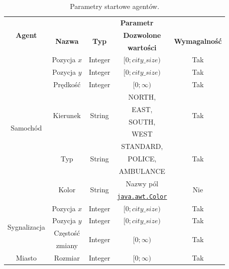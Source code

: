 \documentclass[a4paper,11pt]{article}
\begin{document}
\begin{table}[ht!]
    \centering
    \begin{tabular}{|c|c|c|c|c|}
        \hline
        \multirow{3}{*}{\textbf{Agent}} & \multicolumn{4}{|c|}{\textbf{Parametr}} \\
        \cline{2-5}
        & \multirow{2}{*}{\textbf{Nazwa}} & \multirow{2}{*}{\textbf{Typ}} & \textbf{Dozwolone} & \multirow{2}{*}{\textbf{Wymagalność}} \\
        &&& \textbf{wartości} & \\
        \hline
        \multirow{12}{*}{Samochód} & Pozycja $x$ & Integer & $[0;city\_size)$ & Tak \\
        \cline{2-5}
        & Pozycja $y$ & Integer & $[0;city\_size)$ & Tak \\
        \cline{2-5}
        & Prędkość & Integer & $[0;\infty)$ & Tak \\
        \cline{2-5}
        & \multirow{4}{*}{Kierunek} & \multirow{4}{*}{String} & NORTH, & \multirow{4}{*}{Tak} \\
        &&& EAST, & \\
        &&& SOUTH, & \\
        &&& WEST & \\
        \cline{2-5}
        & \multirow{3}{*}{Typ} & \multirow{3}{*}{String} & STANDARD, & \multirow{3}{*}{Tak} \\
        &&& POLICE, & \\
        &&& AMBULANCE & \\
        \cline{2-5}
        & \multirow{2}{*}{Kolor} & \multirow{2}{*}{String} & Nazwy pól & \multirow{2}{*}{Nie} \\
        &&& \href{http://docs.oracle.com/javase/1.4.2/docs/api/java/awt/Color.html}{\texttt{java.awt.Color}} & \\
        \hline
        \multirow{4}{*}{Sygnalizacja} & Pozycja $x$ & Integer & $[0;city\_size)$ & Tak \\
        \cline{2-5}
        & Pozycja $y$ & Integer & $[0;city\_size)$ & Tak \\
        \cline{2-5}
        & Częstość & \multirow{2}{*}{Integer} & \multirow{2}{*}{$[0;\infty)$} & \multirow{2}{*}{Tak} \\
        & zmiany &&& \\
        \hline
        Miasto & Rozmiar & Integer & $[0;\infty)$ & Tak \\
        \hline
    \end{tabular}

    \caption{Parametry startowe agentów.}
    \label{tab:parameters}
\end{table}
\end{document}
